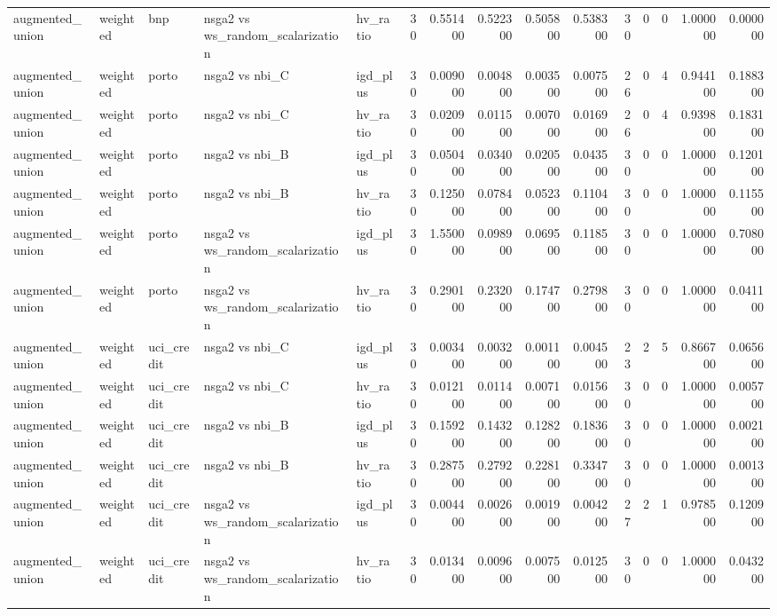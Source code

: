 \begin{landscape}
\begin{longtable}{lllllrrrrrrrrrr}
augmented\_union & weighted & bnp & nsga2 vs ws\_random\_scalarization & hv\_ratio & 30 & 0.551400 & 0.522300 & 0.505800 & 0.538300 & 30 & 0 & 0 & 1.000000 & 0.000000 \\
augmented\_union & weighted & porto & nsga2 vs nbi\_C & igd\_plus & 30 & 0.009000 & 0.004800 & 0.003500 & 0.007500 & 26 & 0 & 4 & 0.944100 & 0.188300 \\
augmented\_union & weighted & porto & nsga2 vs nbi\_C & hv\_ratio & 30 & 0.020900 & 0.011500 & 0.007000 & 0.016900 & 26 & 0 & 4 & 0.939800 & 0.183100 \\
augmented\_union & weighted & porto & nsga2 vs nbi\_B & igd\_plus & 30 & 0.050400 & 0.034000 & 0.020500 & 0.043500 & 30 & 0 & 0 & 1.000000 & 0.120100 \\
augmented\_union & weighted & porto & nsga2 vs nbi\_B & hv\_ratio & 30 & 0.125000 & 0.078400 & 0.052300 & 0.110400 & 30 & 0 & 0 & 1.000000 & 0.115500 \\
augmented\_union & weighted & porto & nsga2 vs ws\_random\_scalarization & igd\_plus & 30 & 1.550000 & 0.098900 & 0.069500 & 0.118500 & 30 & 0 & 0 & 1.000000 & 0.708000 \\
augmented\_union & weighted & porto & nsga2 vs ws\_random\_scalarization & hv\_ratio & 30 & 0.290100 & 0.232000 & 0.174700 & 0.279800 & 30 & 0 & 0 & 1.000000 & 0.041100 \\
augmented\_union & weighted & uci\_credit & nsga2 vs nbi\_C & igd\_plus & 30 & 0.003400 & 0.003200 & 0.001100 & 0.004500 & 23 & 2 & 5 & 0.866700 & 0.065600 \\
augmented\_union & weighted & uci\_credit & nsga2 vs nbi\_C & hv\_ratio & 30 & 0.012100 & 0.011400 & 0.007100 & 0.015600 & 30 & 0 & 0 & 1.000000 & 0.005700 \\
augmented\_union & weighted & uci\_credit & nsga2 vs nbi\_B & igd\_plus & 30 & 0.159200 & 0.143200 & 0.128200 & 0.183600 & 30 & 0 & 0 & 1.000000 & 0.002100 \\
augmented\_union & weighted & uci\_credit & nsga2 vs nbi\_B & hv\_ratio & 30 & 0.287500 & 0.279200 & 0.228100 & 0.334700 & 30 & 0 & 0 & 1.000000 & 0.001300 \\
augmented\_union & weighted & uci\_credit & nsga2 vs ws\_random\_scalarization & igd\_plus & 30 & 0.004400 & 0.002600 & 0.001900 & 0.004200 & 27 & 2 & 1 & 0.978500 & 0.120900 \\
augmented\_union & weighted & uci\_credit & nsga2 vs ws\_random\_scalarization & hv\_ratio & 30 & 0.013400 & 0.009600 & 0.007500 & 0.012500 & 30 & 0 & 0 & 1.000000 & 0.043200 \\

\end{longtable}
\end{landscape}
